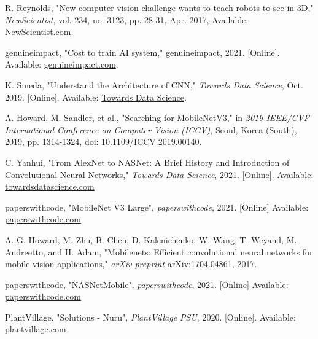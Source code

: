 \documentclass[conference]{IEEEtran}
\begin{document}
\begin{thebibliography}{00}
 R. Reynolds, "New computer vision challenge wants to teach robots to see in 3D," \textit{NewScientist}, vol. 234, no. 3123, pp. 28-31, Apr. 2017, Available: \href{https://www.newscientist.com/article/2127131-new-computer-vision-challenge-wants-to-teach-robots-to-see-in-3d/}{NewScientist.com}.

 genuineimpact, "Cost to train AI system," genuineimpact, 2021. [Online]. Available: \href{https://i.redd.it/c9lyy4252qia1.png}{genuineimpact.com}.

 K. Smeda, "Understand the Architecture of CNN," \textit{Towards Data Science}, Oct. 2019. [Online]. Available: \href{https://towardsdatascience.com/understand-the-architecture-of-cnn-90a25e244c7}{Towards Data Science}.


 A. Howard, M. Sandler, et al., "Searching for MobileNetV3," in \textit{2019 IEEE/CVF International Conference on Computer Vision (ICCV)}, Seoul, Korea (South), 2019, pp. 1314-1324, doi: 10.1109/ICCV.2019.00140.

 C. Yanhui, "From AlexNet to NASNet: A Brief History and Introduction of Convolutional Neural Networks," \textit{Towards Data Science}, 2021. [Online]. Available: \href{https://towardsdatascience.com/from-alexnet-to-NASNet-a-brief-history-and-introduction-of-convolutional-neural-networks-cf63bf3320e1}{towardsdatascience.com}

 paperswithcode, "MobileNet V3 Large", \textit{paperswithcode}, 2021. [Online] Available: \href{https://paperswithcode.com/lib/torchvision/mobilenet-v3}{paperswithcode.com}

 A. G. Howard, M. Zhu, B. Chen, D. Kalenichenko, W. Wang, T. Weyand, M. Andreetto, and H. Adam, "Mobilenets: Efficient convolutional neural networks for mobile vision applications," \textit{arXiv preprint} arXiv:1704.04861, 2017.

 paperswithcode, "NASNetMobile", \textit{paperswithcode}, 2021. [Online] Available: \href{https://paperswithcode.com/lib/torchvision/mnasnet-1-0}{paperswithcode.com}


 PlantVillage, "Solutions - Nuru", \textit{PlantVillage PSU}, 2020. [Online]. Available: \href{https://plantvillage.psu.edu/projects}{plantvillage.com}



\end{thebibliography}
\end{document}
